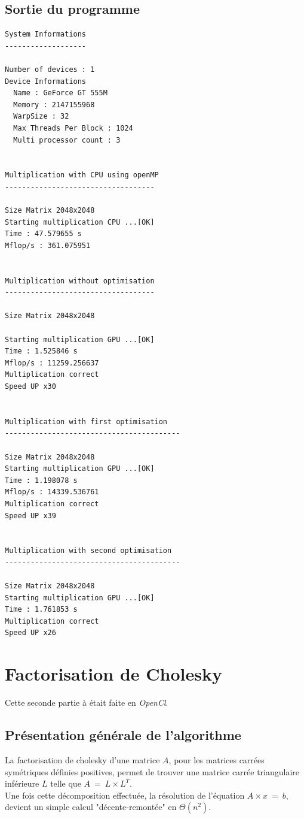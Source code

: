\documentclass[paper=a4, fontsize=11pt]{scrartcl} %
\numberwithin{equation}{section} %
\numberwithin{figure}{section} %
\numberwithin{table}{section} %
\begin{document}
\subsection{Sortie du programme}
\begin{verbatim}
System Informations
-------------------

Number of devices : 1
Device Informations
  Name : GeForce GT 555M
  Memory : 2147155968
  WarpSize : 32
  Max Threads Per Block : 1024
  Multi processor count : 3


Multiplication with CPU using openMP
-----------------------------------

Size Matrix 2048x2048
Starting multiplication CPU ...[OK]
Time : 47.579655 s
Mflop/s : 361.075951 


Multiplication without optimisation
-----------------------------------

Size Matrix 2048x2048

Starting multiplication GPU ...[OK]
Time : 1.525846 s
Mflop/s : 11259.256637 
Multiplication correct
Speed UP x30


Multiplication with first optimisation
-----------------------------------------

Size Matrix 2048x2048
Starting multiplication GPU ...[OK]
Time : 1.198078 s
Mflop/s : 14339.536761 
Multiplication correct
Speed UP x39


Multiplication with second optimisation
-----------------------------------------

Size Matrix 2048x2048
Starting multiplication GPU ...[OK]
Time : 1.761853 s
Multiplication correct
Speed UP x26
\end{verbatim}


\section{Factorisation de Cholesky}

Cette seconde partie à était faite en \textit{OpenCl}.

\subsection{Présentation générale de l'algorithme}
La factorisation de cholesky d'une matrice $A$, pour les matrices
carrées symétriques définies positives, permet de trouver une matrice
carrée triangulaire inférieure $L$ telle que $A\ =\ L\times L^{T}$. \\

Une fois cette décomposition effectuée, la résolution de l'équation
$A\times x\ =\ b$, devient un simple calcul "décente-remontée" en
$\Theta(n^2)$.
\end{document}
